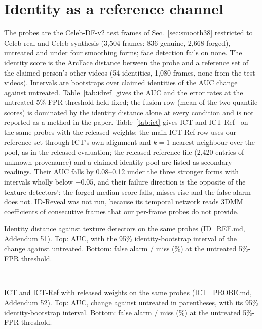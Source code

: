 \documentclass[10pt]{article}
\begin{document}
\section{Identity as a reference channel}
\label{sec:idref}
The probes are the Celeb-DF-v2 test frames of Sec.~\ref{sec:smooth38} restricted to Celeb-real and Celeb-synthesis (3,504
frames: 836 genuine, 2,668 forged), untreated and under four smoothing forms; face detection fails on none. The identity score
is the ArcFace distance between the probe and a reference set of the claimed person's other videos (54 identities, 1,080
frames, none from the test videos). Intervals are bootstraps over claimed identities of the AUC change against untreated.
Table~\ref{tab:idref} gives the AUC and the error rates at the untreated 5\%-FPR threshold held fixed; the fusion row (mean
of the two quantile scores) is dominated by the identity distance alone at every condition and is not reported as a method in
the paper. Table~\ref{tab:ict} gives ICT and ICT-Ref~\cite{ict2022} on the same probes with the released weights: the main
ICT-Ref row uses our reference set through ICT's own alignment and $k=1$ nearest neighbour over the pool, as in the released
evaluation; the released reference file (2,420 entries of unknown provenance) and a claimed-identity pool are listed as
secondary readings. Their AUC falls by 0.08--0.12 under the three stronger forms with intervals wholly below $-0.05$, and
their failure direction is the opposite of the texture detectors': the forged median score falls, misses rise and the false
alarm does not. ID-Reveal was not run, because its temporal network reads 3DMM coefficients of consecutive frames that our
per-frame probes do not provide.
\begin{table}[H]
\centering
\caption{Identity distance against texture detectors on the same probes (ID\_REF.md, Addendum 51). Top: AUC, with the 95\%
identity-bootstrap interval of the change against untreated. Bottom: false alarm / miss (\%) at the untreated 5\%-FPR threshold.}
\label{tab:idref}
\scriptsize
\begin{adjustbox}{max width=\linewidth}\end{adjustbox}\\[4pt]
\begin{adjustbox}{max width=\linewidth}\end{adjustbox}
\end{table}
\begin{table}[H]
\centering
\caption{ICT and ICT-Ref with released weights on the same probes (ICT\_PROBE.md, Addendum 52). Top: AUC, change against
untreated in parentheses, with its 95\% identity-bootstrap interval. Bottom: false alarm / miss (\%) at the untreated 5\%-FPR
threshold.}
\label{tab:ict}
\scriptsize
\begin{adjustbox}{max width=\linewidth}\end{adjustbox}\\[4pt]
\begin{adjustbox}{max width=\linewidth}\end{adjustbox}
\end{table}
\end{document}
